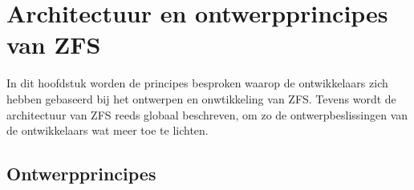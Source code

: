 
\chapter{Architectuur en ontwerpprincipes van ZFS}
\label{ch:h3}

In dit hoofdstuk worden de principes besproken waarop de ontwikkelaars zich hebben gebaseerd bij het ontwerpen en onwtikkeling van ZFS. Tevens wordt de architectuur van ZFS reeds globaal beschreven, om zo de ontwerpbeslissingen van de ontwikkelaars wat meer toe te lichten.

\section{Ontwerpprincipes}
